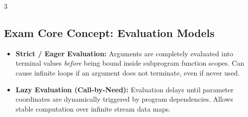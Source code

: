 \documentclass[8.5pt,landscape,a4paper]{article}
\begin{document}
\begin{multicols*}{3}
\subsection{Exam Core Concept: Evaluation Models}
\begin{itemize}
    \item \textbf{Strict / Eager Evaluation:} Arguments are completely evaluated into terminal values \textit{before} being bound inside subprogram function scopes. Can cause infinite loops if an argument does not terminate, even if never used.
    \item \textbf{Lazy Evaluation (Call-by-Need):} Evaluation delays until parameter coordinates are dynamically triggered by program dependencies. Allows stable computation over infinite stream data maps.
\end{itemize}

\end{multicols*}
\end{document}
